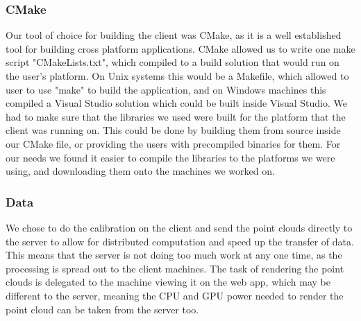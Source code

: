 \documentclass{article}
\begin{document}
\subsubsection{CMake}
Our tool of choice for building the client was CMake, as it is a well established tool for building cross platform applications. CMake allowed us to write one make script "CMakeLists.txt", which compiled to a build solution that would run on the user's platform. On Unix systems this would be a Makefile, which allowed to user to use "make" to build the application, and on Windows machines this compiled a Visual Studio solution which could be built inside Visual Studio. We had to make sure that the libraries we used were built for the platform that the client was running on. This could be done by building them from source inside our CMake file, or providing the users with precompiled binaries for them. For our needs we found it easier to compile the libraries to the platforms we were using, and downloading them onto the machines we worked on. 
\subsubsection{Data}
We chose to do the calibration on the client and send the point clouds directly to the server to allow for distributed computation and speed up the transfer of data. This means that the server is not doing too much work at any one time, as the processing is spread out to the client machines. The task of rendering the point clouds is delegated to the machine viewing it on the web app, which may be different to the server, meaning the CPU and GPU power needed to render the point cloud can be taken from the server too.
\newpage
\end{document}

